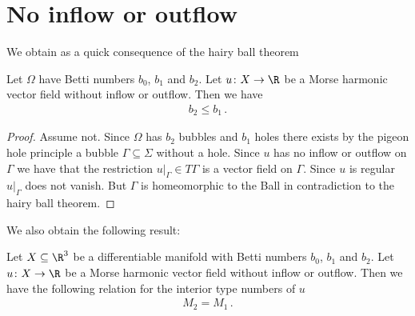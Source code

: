 \section{No inflow or outflow}
We obtain as a quick consequence of the hairy ball theorem
\begin{proposition}
  Let $\Omega$ have Betti numbers $b_0$, $b_1$ and $b_2$.
  Let $u\colon X\to\R$
  be a Morse harmonic vector field without inflow or outflow. Then we have
  \begin{align*}
    b_2\leq b_1\,.
  \end{align*}
\end{proposition}
\begin{proof} 
  Assume not. Since $\Omega$ has $b_2$ bubbles and $b_1$ holes there exists by the pigeon hole
  principle a bubble $\Gamma\subseteq\Sigma$ without a hole. Since $u$ has no inflow or outflow on $\Gamma$ we
  have that the restriction $u\vert_\Gamma\in T\Gamma$ is a vector field on $\Gamma$. Since $u$ is regular
  $u\vert_\Gamma$ does not vanish. But $\Gamma$ is homeomorphic to the Ball in contradiction to the hairy ball theorem.
\end{proof}
We also obtain the following result:
\begin{proposition}
  Let $X\subseteq\R^3$ be a differentiable manifold with Betti numbers $b_0$, $b_1$ and $b_2$.
  Let $u\colon X\to\R$ be a Morse harmonic vector field without inflow or outflow. Then we have the following relation for
  the interior type numbers of $u$
  \begin{align*}
    M_2=M_1\,.
  \end{align*}
\end{proposition}
